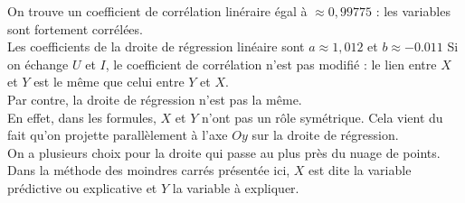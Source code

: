 \begin{solution}
On trouve un coefficient de corr\' elation lin\' eraire \' egal \` a $\approx 0,99775$ : les variables sont fortement corr\' el\' ees.\\
Les coefficients de la droite de r\' egression lin\' eaire sont $a\approx 1,012$ et $b\approx -0.011$
Si on \' echange $U$ et $I$, le coefficient de corr\' elation n'est pas modifi\' e : le lien entre $X$ et $Y$ est le m\^ eme que celui entre $Y$ et $X$.\\
Par contre, la droite de r\' egression n'est pas la m\^ eme.\\
En effet, dans les formules, $X$ et $Y$ n'ont pas un r\^ ole sym\' etrique. Cela vient du fait qu'on projette parall\` element \` a l'axe $Oy$ sur la droite de r\' egression. \\
On a plusieurs choix pour la droite qui passe au plus pr\` es du nuage de points. Dans la m\' ethode des moindres carr\' es pr\' esent\' ee ici, $X$ est dite la variable pr\' edictive ou explicative et $Y$ la variable \` a expliquer.
\end{solution}














